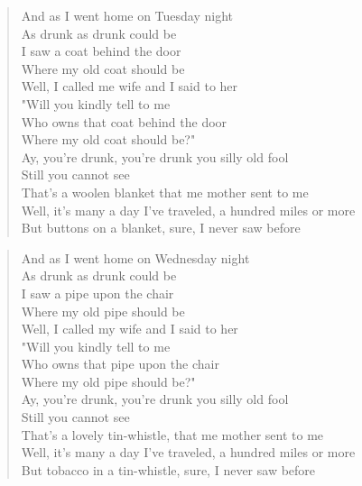 \documentclass[8pt,twoside]{extarticle}
\newenvironment{xverse}{
	\penalty 10000
	\begin{verse}
	\parskip 4pt
	}
	{
	\end{verse}
	\penalty 0
	}
\begin{document}
\begin{xverse}
And as I went home on Tuesday night \\
As drunk as drunk could be \\
I saw a coat behind the door \\
Where my old coat should be \\
Well, I called me wife and I said to her \\
"Will you kindly tell to me \\
Who owns that coat behind the door \\
Where my old coat should be?" \\
Ay, you're drunk, you're drunk you silly old fool \\
Still you cannot see \\
That's a woolen blanket that me mother sent to me \\
Well, it's many a day I've traveled, a hundred miles or more \\
But buttons on a blanket, sure, I never saw before \\
\end{xverse}

\begin{xverse}
And as I went home on Wednesday night \\
As drunk as drunk could be \\
I saw a pipe upon the chair \\
Where my old pipe should be \\
Well, I called my wife and I said to her \\
"Will you kindly tell to me \\
Who owns that pipe upon the chair \\
Where my old pipe should be?" \\
Ay, you're drunk, you're drunk you silly old fool \\
Still you cannot see \\
That's a lovely tin-whistle, that me mother sent to me \\
Well, it's many a day I've traveled, a hundred miles or more \\
But tobacco in a tin-whistle, sure, I never saw before \\
\end{xverse}
\end{document}
